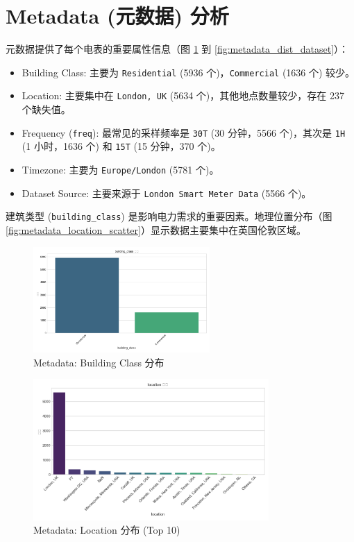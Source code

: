 \documentclass{article} %
\begin{document}
\section{Metadata (元数据) 分析}
\label{sec:metadata_analysis}

元数据提供了每个电表的重要属性信息（图 \ref{fig:metadata_dist_building_class} 到 \ref{fig:metadata_dist_dataset}）：
\begin{itemize}
    \item Building Class: 主要为 \texttt{Residential} (5936 个)，\texttt{Commercial} (1636 个) 较少。
    \item Location: 主要集中在 \texttt{London, UK} (5634 个)，其他地点数量较少，存在 237 个缺失值。
    \item Frequency (\texttt{freq}): 最常见的采样频率是 \texttt{30T} (30 分钟，5566 个)，其次是 \texttt{1H} (1 小时，1636 个) 和 \texttt{15T} (15 分钟，370 个)。
    \item Timezone: 主要为 \texttt{Europe/London} (5781 个)。
    \item Dataset Source: 主要来源于 \texttt{London Smart Meter Data} (5566 个)。
\end{itemize}
建筑类型 (\texttt{building\_class}) 是影响电力需求的重要因素。地理位置分布（图 \ref{fig:metadata_location_scatter}）显示数据主要集中在英国伦敦区域。

\begin{figure}[H]
    \centering
    \includegraphics[width=0.6\textwidth]{../plots/metadata_dist_building_class.png}
    \caption{Metadata: Building Class 分布}
    \label{fig:metadata_dist_building_class}
\end{figure}

\begin{figure}[H]
    \centering
    \includegraphics[width=0.8\textwidth]{../plots/metadata_dist_location.png}
    \caption{Metadata: Location 分布 (Top 10)}
    \label{fig:metadata_dist_location}
\end{figure}
\end{document}
